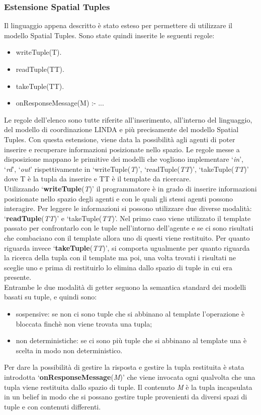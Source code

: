 \subsubsection{Estensione Spatial Tuples}
Il linguaggio appena descritto \`e stato esteso per permettere di utilizzare il modello Spatial Tuples. Sono state quindi inserite le seguenti regole:
\begin{itemize}
\item writeTuple(T).
\item readTuple(TT).
\item takeTuple(TT).
\item onResponseMessage(M) :- ...
\end{itemize}
Le regole dell'elenco sono tutte riferite all'inserimento, all'interno del linguaggio, del modello di coordinazione LINDA e pi\`u precisamente del modello Spatial Tuples.
Con questa estensione, viene data la possibilit\`a agli agenti di poter inserire e recuperare informazioni posizionate nello spazio. Le regole messe a disposizione mappano le primitive dei modelli che vogliono implementare `\textit{in}', `\textit{rd}', `\textit{out}' rispettivamente in `writeTuple(\textit{T})', `readTuple(\textit{TT})', `takeTuple(\textit{TT})' dove T \`e la tupla da inserire e TT \`e il template da ricercare.
\\
Utilizzando `\textbf{writeTuple}(\textit{T})' il programmatore \`e in grado di inserire informazioni posizionate nello spazio degli agenti e con le quali gli stessi agenti possono interagire. Per leggere le informazioni si possono utilizzare due diverse modalit\`a: `\textbf{readTuple}(\textit{TT})' e `takeTuple(\textit{TT})'. Nel primo caso viene utilizzato il template passato per confrontarlo con le tuple nell'intorno dell'agente e se ci sono risultati che combaciano con il template allora uno di questi viene restituito. Per quanto riguarda invece `\textbf{takeTuple}(\textit{TT})', si comporta ugualmente per quanto riguarda la ricerca della tupla con il template ma poi, una volta trovati i risultati ne sceglie uno e prima di restituirlo lo elimina dallo spazio di tuple in cui era presente.
\\
Entrambe le due modalit\`a di getter seguono la semantica standard dei modelli basati su tuple, e quindi sono:
\begin{itemize}
\item sospensive: se non ci sono tuple che si abbinano al template l'operazione \`e bloccata finch\`e non viene trovata una tupla;
\item non deterministiche: se ci sono pi\`u tuple che si abbinano al template una \`e scelta in modo non deterministico.
\end{itemize}
Per dare la possibilit\`a di gestire la risposta e gestire la tupla restituita \`e stata introdotta `\textbf{onResponseMessage}(\textit{M})' che viene invocata ogni qualvolta che una tupla viene restituita dallo spazio di tuple. Il contenuto \textit{M} \`e la tupla incapsulata in un belief in modo che si possano gestire tuple provenienti da diversi spazi di tuple e con contenuti differenti.

